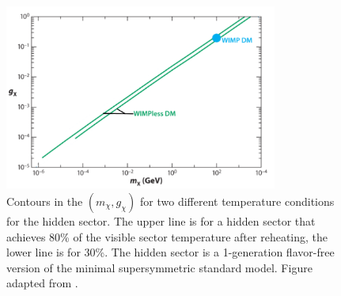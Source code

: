 \begin{figure}[htbp]
\begin{center}
\includegraphics[width=0.8\textwidth]{figures/theory/wimpless_miracle.png}
\caption{Contours in the $(m_{\chi}, g_{\chi})$ for two different temperature conditions for the hidden sector. The upper line is for a hidden sector that achieves 80\% of the visible sector temperature after reheating, the lower line is for 30\%. The hidden sector is a 1-generation flavor-free version of the minimal supersymmetric standard model. Figure adapted from \cite{Feng2010}. }
\label{fig:wimpless_miracle}
\end{center}
\end{figure}

